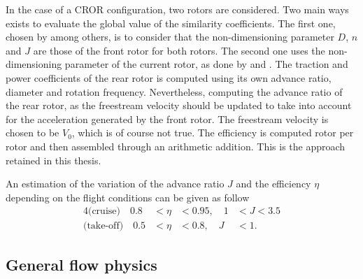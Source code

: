 In the case of a CROR configuration, two rotors are considered.
Two main ways exists to evaluate the global value of the
similarity coefficients. The first one, chosen by
\citet{Bechet2011} among others, is to consider
that the non-dimensioning parameter $D$, $n$ and $J$ are those
of the front rotor for both rotors. 
The second one uses the non-dimensioning parameter of the current rotor,
as done by \citet{Stuermer2008} and \citet{Zachariadis2011}.
The traction and power coefficients of the rear rotor is
computed using its own advance ratio, diameter and rotation frequency.
Nevertheless, computing the advance ratio of the rear rotor, as
the freestream velocity should be updated to take into account
for the acceleration generated by the front rotor. The freestream
velocity is chosen to be $V_0$, which is of course not true.
The efficiency is computed rotor per rotor and then
assembled through an arithmetic addition. This is the approach retained
in this thesis.

An estimation of the variation of the advance ratio $J$ and the 
efficiency $\eta$ depending on the flight conditions can be given as follow
\begin{alignat}{4}
    \text{(cruise)} \quad  0.8 &< \eta &< 0.95, \quad 1 &< J < 3.5 \\
    \text{(take-off)} \quad  0.5 &< \eta &< 0.8, \quad J &< 1.
\end{alignat}

\subsection{General flow physics}
\label{sub:ca_general_flow_physics}






